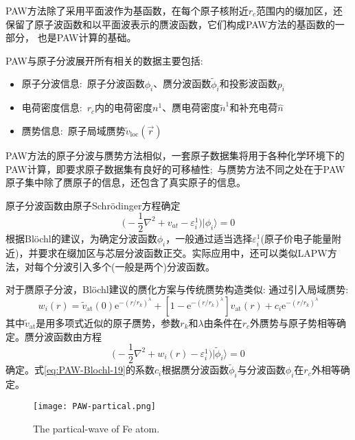 \textrm{PAW}方法除了采用平面波作为基函数，在每个原子核附近$r_c$范围内的缀加区，还保留了原子波函数和以平面波表示的赝波函数，它们构成\textrm{PAW}方法的基函数的一部分，%
也是\textrm{PAW}计算的基础。

\textrm{PAW}与原子分波展开所有相关的数据主要包括:~
	\begin{itemize}
		\item 原子分波信息:~原子分波函数$\phi_i$、赝分波函数$\tilde\phi_i$和投影波函数$p_i$
		\item 电荷密度信息:~$r_c$内的电荷密度$n^1$、赝电荷密度$\tilde n^1$和补充电荷$\hat n$
		\item 赝势信息:~原子局域赝势$\tilde v_{\mathrm{loc}}(\vec r)$
	\end{itemize}
\textrm{PAW}方法的原子分波与赝势方法相似，一套原子数据集将用于各种化学环境下的\textrm{PAW}计算，即要求原子数据集有良好的可移植性;~与赝势方法不同之处在于\textrm{PAW}原子集中除了赝原子的信息，还包含了真实原子的信息。

原子分波函数由原子\textrm{Schr\"odinger}方程确定
\begin{equation}
	\bigg(-\dfrac12\nabla^2+v_{at}-\varepsilon_i^1\bigg)|\phi_i\rangle=0
	\label{eq:PAW-Blochl-18}
\end{equation}
根据\textrm{Bl\"ochl}的建议，为确定分波函数$\phi_i$，一般通过适当选择$\varepsilon_i^1$(原子价电子能量附近)，并要求在缀加区与芯层分波函数正交。实际应用中，还可以类似\textrm{LAPW}方法，对每个分波引入多个(一般是两个)分波函数。

对于赝原子分波，\textrm{Bl\"ochl}建议的赝化方案与传统赝势构造类似:
通过引入局域赝势:%
\begin{equation}
	w_i(r)=\tilde v_{\mathrm{at}}(0)\mathrm{e}^{-(r/r_k)^{\lambda}}+[1-\mathrm{e}^{-(r/r_k)^{\lambda}}]v_{\mathrm{at}}(r)+c_i\mathrm{e}^{-(r/r_k)^{\lambda}}
	\label{eq:PAW-Blochl-19}
\end{equation}
其中$\tilde v_{\mathrm{at}}$是用多项式近似的原子赝势，参数$r_k$和$\lambda$由条件在$r_c$外赝势与原子势相等确定。赝分波函数由方程
\begin{equation}
	\bigg(-\dfrac12\nabla^2+w_i(r)-\varepsilon_i^1\bigg)|\tilde\phi_i\rangle=0
	\label{eq:PAW-Blochl-20}
\end{equation}
确定。式\eqref{eq:PAW-Blochl-19}的系数$c_i$根据赝分波函数$\tilde\phi_i$与分波函数$\phi_i$在$r_c$外相等确定。
\begin{figure}[h!]
\centering
\texttt{[image: PAW-partical.png]}
\caption{\small \textrm{The partical-wave of Fe atom.}}%
\label{PAW_partical_Fe}
\end{figure}

